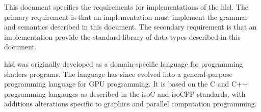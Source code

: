
\p This document specifies the requirements for implementations of the
\acrfull{hlsl}. The primary requirement is that an implementation must implement
the grammar and semantics described in this document. The secondary requirement
is that an implementation provide the standard library of data types described
in this document.

\p \acrshort{hlsl} was originally developed as a domain-specific language for
programming shaders programs. The language has since evolved into a
general-purpose programming language for GPU programming. It is based on the C
and C++ programming langauges as described in the \gls{isoC} and \gls{isoCPP}
standards, with additions alterations specific to graphics and parallel
computation programming.
